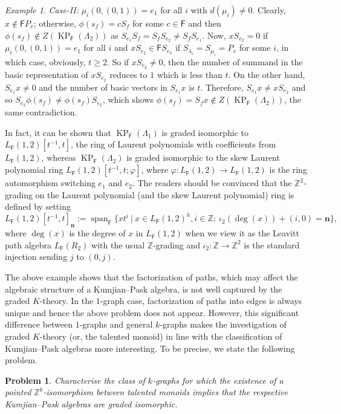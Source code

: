\documentclass[12pt]{amsart}
\newcommand{\KP}{\operatorname{KP}}
\newtheorem{prob}[thm]{Problem}
\theoremstyle{definition}
\theoremstyle{remark}
\newtheorem{example}[thm]{Example}
\newcommand{\lspan}{\operatorname{span}}
\begin{document}
\begin{example}
\emph{Case-II:} $\mu_i(0,(0,1))=e_1$ for all $i$ with $d(\mu_i)\neq 0$. Clearly, $x\notin \mathsf{F}P_v$; otherwise, $\phi(s_f)=cS_f$ for some $c\in \mathsf{F}$ and then $\phi(s_f)\notin Z(\KP_\mathsf{F}(\Lambda_2))$ as $S_{e_1}S_f=S_fS_{e_2}\neq S_f S_{e_1}$. Now, $x S_{e_2}=0$ if $\mu_i(0,(0,1))=e_1$ for all $i$ and $x S_{e_2}\in \mathsf{F}S_{e_2}$ if $S_{\lambda_i}=S_{\mu_i}=P_v$ for some $i$, in which case, obviously, $t\ge 2$. So if $x S_{e_2}\neq 0$, then the number of summand in the basic representation of $x S_{e_2}$ reduces to $1$ which is less than $t$. On the other hand, $S_{e_1}x\neq 0$ and the number of basic vectors in $S_{e_1}x$ is $t$. Therefore, $S_{e_1}x\neq x S_{e_2}$ and so $S_{e_2}\phi(s_f)\neq \phi(s_f)S_{e_2}$, which shows $\phi(s_f)=S_f x\notin Z(\KP_\mathsf{F}(\Lambda_2))$, the same contradiction. 

In fact, it can be shown that $\KP_\mathsf{F}(\Lambda_1)$ is graded isomorphic to $L_\mathsf{F}(1,2)[t^{-1},t]$, the ring of Laurent polynomials with coefficients from $L_\mathsf{F}(1,2)$, whereas $\KP_\mathsf{F}(\Lambda_2)$ is graded isomorphic to the skew Laurent polynomial ring $L_\mathsf{F}(1,2)[t^{-1},t;\varphi]$, where $\varphi:L_\mathsf{F}(1,2)\longrightarrow L_\mathsf{F}(1,2)$ is the ring automorphism switching $e_1$ and $e_2$. The readers should be convinced that the $\mathbb{Z}^2$-grading on the Laurent polynomial (and the skew Laurent polynomial) ring is defined by setting \[L_\mathsf{F}(1,2)[t^{-1},t]_{\mathbf{n}}:=\lspan_\mathsf{F} \{xt^i~|~x\in L_\mathsf{F}(1,2)^h,i\in \mathbb{Z};~ \iota_2(\deg(x))+(i,0)=\mathbf{n}\},\] where $\deg(x)$ is the degree of $x$ in $L_\mathsf{F}(1,2)$ when we view it as the Leavitt path algebra $L_\mathsf{F}(R_2)$ with the usual $\mathbb{Z}$-grading and $\iota_2:\mathbb{Z}\longrightarrow \mathbb{Z}^2$ is the standard injection sending $j$ to $(0,j)$.     
\end{example} 

The above example shows that the factorization of paths, which may affect the algebraic structure of a Kumjian--Pask algebra, is not well captured by the graded $K$-theory. In the $1$-graph case, factorization of paths into edges is always unique and hence the above problem does not appear. However, this significant difference between $1$-graphs and general $k$-graphs makes the investigation of graded $K$-theory (or, the talented monoid) in line with the classification of Kumjian--Pask algebras more interesting. To be precise, we state the following problem.

\begin{prob}\label{prob For which k-graphs TM can classify KP-algebras upto graded isomorphism}
Characterise the class of $k$-graphs for which the existence of a pointed $\mathbb{Z}^k$-isomorphism between talented monoids implies that the respective Kumjian--Pask algebras are graded isomorphic. 
\end{prob}
\end{document}
